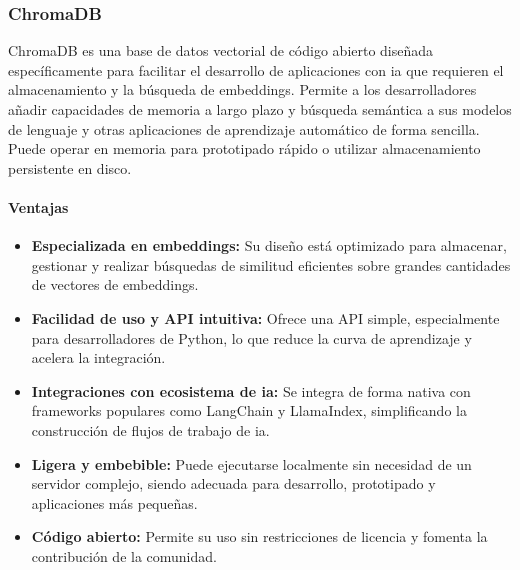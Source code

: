 \subsubsection{ChromaDB} %
ChromaDB es una base de datos vectorial de código abierto diseñada específicamente para facilitar el desarrollo de aplicaciones con \gls{ia} que requieren el almacenamiento y la búsqueda de embeddings. Permite a los desarrolladores añadir capacidades de memoria a largo plazo y búsqueda semántica a sus modelos de lenguaje y otras aplicaciones de aprendizaje automático de forma sencilla. Puede operar en memoria para prototipado rápido o utilizar almacenamiento persistente en disco.

\paragraph{Ventajas}
\begin{itemize}
    \item \textbf{Especializada en embeddings:} Su diseño está optimizado para almacenar, gestionar y realizar búsquedas de similitud eficientes sobre grandes cantidades de vectores de embeddings.
    \item \textbf{Facilidad de uso y API intuitiva:} Ofrece una API simple, especialmente para desarrolladores de Python, lo que reduce la curva de aprendizaje y acelera la integración.
    \item \textbf{Integraciones con ecosistema de \gls{ia}:} Se integra de forma nativa con frameworks populares como LangChain y LlamaIndex, simplificando la construcción de flujos de trabajo de \gls{ia}.
    \item \textbf{Ligera y embebible:} Puede ejecutarse localmente sin necesidad de un servidor complejo, siendo adecuada para desarrollo, prototipado y aplicaciones más pequeñas.
    \item \textbf{Código abierto:} Permite su uso sin restricciones de licencia y fomenta la contribución de la comunidad.
\end{itemize}

